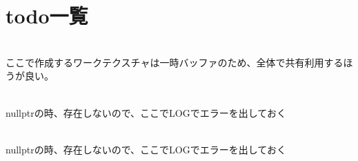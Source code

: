 \chapter{todo一覧 }
\hypertarget{todo}{}\label{todo}

\begin{DoxyRefList}
\item[メンバ \doxylink{class_component_filter_fade_a7defc3ca2dfdafe72c6913b3428c3ebb}{Component\+Filter\+Fade\+::Component\+Filter\+Fade} ()]\hfill \\
\label{todo__todo000001}%
%
ここで作成するワークテクスチャは一時バッファのため、全体で共有利用するほうが良い。  
\item[メンバ \doxylink{class_scene_a9e143dc2e860651e852c1b45b0d9b3c3}{Scene\+::Get\+Object\+Ptr} (std\+::string\+\_\+view name="{}"{})]\hfill \\
\label{todo__todo000002}%
%
nullptrの時、存在しないので、ここで\+LOGでエラーを出しておく  
\item[メンバ \doxylink{struct_scene_1_1_object_a964e234a55f60b3989ad24a26df11c15}{Scene\+::Object\+::Get} (std\+::string\+\_\+view name="{}"{})]\hfill \\
\label{todo__todo000003}%
%
nullptrの時、存在しないので、ここで\+LOGでエラーを出しておく 
\end{DoxyRefList}